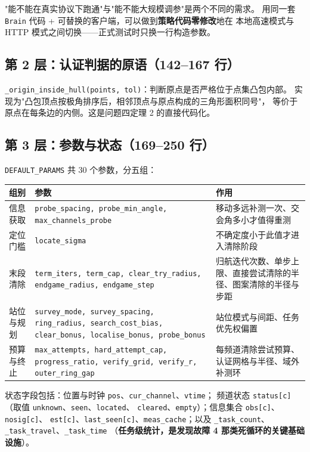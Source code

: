 \begin{keybox}[title=为什么保留两个客户端]
"能不能在真实协议下跑通"与"能不能大规模调参"是两个不同的需求。
用同一套 \texttt{Brain} 代码 + 可替换的客户端，可以做到\textbf{策略代码零修改}地在
本地高速模式与 HTTP 模式之间切换——正式测试时只换一行构造参数。
\end{keybox}

\subsection{第 2 层：认证判据的原语（142--167 行）}

\texttt{\_origin\_inside\_hull(points, tol)}：判断原点是否严格位于点集凸包内部。
实现为"凸包顶点按极角排序后，相邻顶点与原点构成的三角形面积同号"，
等价于原点在每条边的内侧。这是问题四定理 2 的直接代码化。

\subsection{第 3 层：参数与状态（169--250 行）}

\texttt{DEFAULT\_PARAMS} 共 30 个参数，分五组：

\begin{center}
\begin{tabular}{p{1.85cm}p{4.55cm}p{6.9cm}}
\toprule
组别 & 参数 & 作用 \\ \midrule
信息获取 & \texttt{probe\_spacing, probe\_min\_angle, max\_channels\_probe} &
移动多远补测一次、交会角多小才值得重测 \\
定位门槛 & \texttt{locate\_sigma} & 不确定度小于此值才进入清除阶段 \\
末段清除 & \texttt{term\_iters, term\_cap, clear\_try\_radius, endgame\_radius, endgame\_step} &
归航迭代次数、单步上限、直接尝试清除的半径、图案清除的半径与步距 \\
站位与规划 & \texttt{survey\_mode, survey\_spacing, ring\_radius, search\_cost\_bias, clear\_bonus,
localise\_bonus, probe\_bonus} & 站位模式与间距、任务优先权偏置 \\
预算与终止 & \texttt{max\_attempts, hard\_attempt\_cap, progress\_ratio, verify\_grid, verify\_r,
outer\_ring\_gap} & 每频道清除尝试预算、认证网格与半径、域外补测环 \\
\bottomrule
\end{tabular}
\end{center}

状态字段包括：位置与时钟 \texttt{pos}、\texttt{cur\_channel}、\texttt{vtime}；
频道状态 \texttt{status[c]}（取值 \texttt{unknown}、\texttt{seen}、\texttt{located}、
\texttt{cleared}、\texttt{empty}）；信息集合 \texttt{obs[c]}、\texttt{nosig[c]}、
\texttt{est[c]}、\texttt{last\_seen[c]}、\texttt{meas\_cache}；以及
\texttt{\_task\_count}、\texttt{\_task\_travel}、\texttt{\_task\_time}
（\textbf{任务级统计，是发现故障 4 那类死循环的关键基础设施}）。

